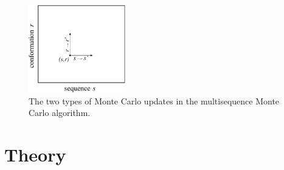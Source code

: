\documentclass[
aip,
rsi,%
amsmath,amssymb,
reprint,%
]{revtex4-1}
\begin{document}







\begin{figure}
\includegraphics[width=4.2cm]{Fig1}
\caption{The two types of Monte Carlo updates in the multisequence Monte Carlo algorithm.}
\end{figure}

\section{Theory}
\end{document}
